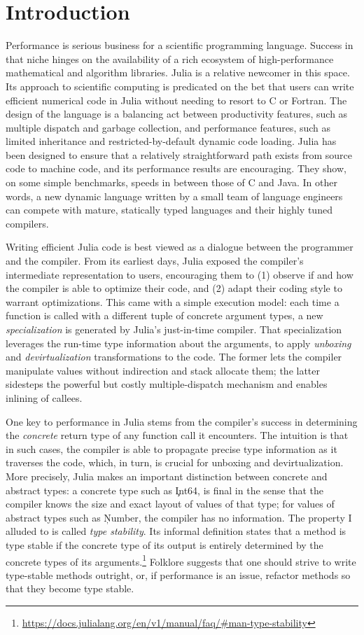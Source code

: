 \chapter{Introduction}%

Performance is serious business for a scientific programming language. Success
in that niche hinges on the availability of a rich ecosystem of high-performance
mathematical and algorithm libraries. Julia is a relative newcomer in this space.
Its approach to scientific computing is predicated on the bet that
users can write efficient numerical code in Julia without needing to resort to C
or Fortran.
%
The design of the language is a balancing act between productivity features, such
as multiple dispatch and garbage collection, and performance features, such as
limited inheritance and restricted-by-default dynamic code loading.
Julia has been designed to ensure that a
relatively straightforward path exists from source code to machine code,
and its performance results are encouraging. They show, on some simple benchmarks,
speeds in between those of C and Java. In other words, a new dynamic language
written by a small team of language engineers can compete with mature, statically
typed languages and their highly tuned compilers.

Writing efficient Julia code is best viewed as a dialogue between the programmer
and the compiler.
From its earliest days, Julia exposed the compiler's intermediate representation
to users, encouraging them to (1) observe if and how the compiler is able to optimize
their code, and (2) adapt their coding style to warrant optimizations. This came with a
simple execution model: each time a function is called with a different tuple of
concrete argument types, a new \emph{specialization} is generated by Julia's
just-in-time compiler. That specialization leverages the run-time type information
about the arguments, to apply \emph{unboxing} and \emph{devirtualization} transformations
to the code. The former lets the compiler manipulate values without indirection
and stack allocate them; the latter sidesteps the powerful but costly
multiple-dispatch mechanism and enables inlining of callees.

One key to performance in Julia
stems from the compiler's success in determining the \emph{concrete} return
type of any function call it encounters. The intuition is that in such cases,
the compiler is able to propagate precise type information as it traverses the
code, which, in turn, is crucial for unboxing and devirtualization.
More precisely, Julia makes an important distinction between
concrete and abstract types: a concrete type such as \c{Int64}, is final
in the sense that the compiler knows the size and exact layout of
values of that type; for values of abstract types such as \c{Number}, the compiler has
no information. The property I alluded to is called \emph{type stability}.
Its informal definition states that a method is type stable if the concrete type of its
output is entirely determined by the concrete types of its arguments.\footnote{
\url{https://docs.julialang.org/en/v1/manual/faq/\#man-type-stability}} Folklore
suggests that one should strive to write type-stable methods outright, or, if
performance is an issue, refactor methods so that they become type stable.


